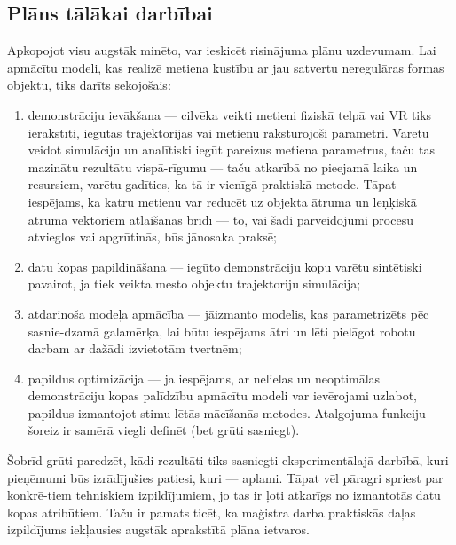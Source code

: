\documentclass[12pt, a4paper]{article}
\numberwithin{equation}{section} %
\begin{document}
\subsection{Plāns tālākai darbībai}

Apkopojot visu augstāk minēto, var ieskicēt risinājuma plānu uzdevumam. Lai apmācītu modeli, kas realizē metiena kustību ar jau satvertu neregulāras formas objektu, tiks darīts sekojošais:

\begin{enumerate}
    \item demonstrāciju ievākšana --- cilvēka veikti metieni fiziskā telpā vai VR tiks ierakstīti, iegūtas trajektorijas vai metienu raksturojoši parametri. Varētu veidot simulāciju un analītiski iegūt pareizus metiena parametrus, taču tas mazinātu rezultātu vispā-rīgumu --- taču atkarībā no pieejamā laika un resursiem, varētu gadīties, ka tā ir vienīgā praktiskā metode. Tāpat iespējams, ka katru metienu var reducēt uz objekta ātruma un leņķiskā ātruma vektoriem atlaišanas brīdī --- to, vai šādi pārveidojumi procesu atvieglos vai apgrūtinās, būs jānosaka praksē;
    \item datu kopas papildināšana --- iegūto demonstrāciju kopu varētu sintētiski pavairot, ja tiek veikta mesto objektu trajektoriju simulācija;
    \item atdarinoša modeļa apmācība --- jāizmanto modelis, kas parametrizēts pēc sasnie-dzamā galamērķa, lai būtu iespējams ātri un lēti pielāgot robotu darbam ar dažādi izvietotām tvertnēm;
    \item papildus optimizācija --- ja iespējams, ar nelielas un neoptimālas demonstrāciju kopas palīdzību apmācītu modeli var ievērojami uzlabot, papildus izmantojot stimu-lētās mācīšanās metodes. Atalgojuma funkciju šoreiz ir samērā viegli definēt (bet grūti sasniegt).
\end{enumerate}

Šobrīd grūti paredzēt, kādi rezultāti tiks sasniegti eksperimentālajā darbībā, kuri pieņēmumi būs izrādījušies patiesi, kuri --- aplami. Tāpat vēl pāragri spriest par konkrē-tiem tehniskiem izpildījumiem, jo tas ir ļoti atkarīgs no izmantotās datu kopas atribūtiem. Taču ir pamats ticēt, ka maģistra darba praktiskās daļas izpildījums iekļausies augstāk aprakstītā plāna ietvaros.

\newpage
{}
\printbibliography[title=Atsauces]
\end{document}
